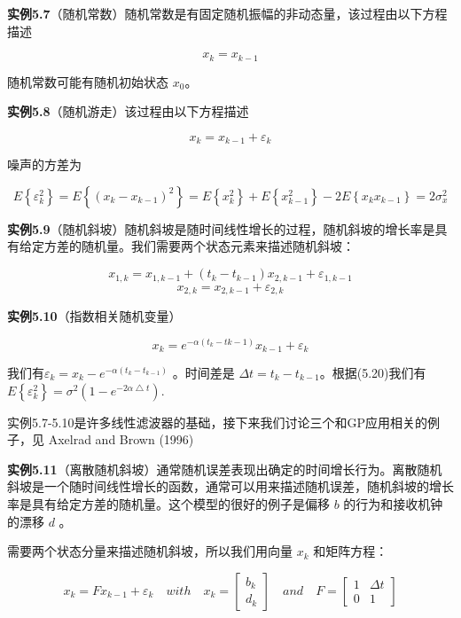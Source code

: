 		 \textbf{实例5.7}（随机常数）随机常数是有固定随机振幅的非动态量，该过程由以下方程描述
		 
		 \[ x_{k}=x_{k-1} \]
		 
		 随机常数可能有随机初始状态 $ x_{0} $。
		 
		 \textbf{实例5.8}（随机游走）该过程由以下方程描述
		 
		 	\[ x_{k}=x_{k-1}+\varepsilon_{k} \]
		 
		 噪声的方差为
		 
		 \[ E\left\lbrace \varepsilon_{k}^{2}\right\rbrace = E\left\lbrace(x_{k}-x_{k-1})^{2} \right\rbrace =E\left\lbrace x_{k}^{2} \right\rbrace +E\left\lbrace x_{k-1}^{2} \right\rbrace -2E\left\lbrace x_{k}x_{k-1} \right\rbrace =2\sigma_{x}^{2} \]
		 
		 \textbf{实例5.9}（随机斜坡）随机斜坡是随时间线性增长的过程，随机斜坡的增长率是具有给定方差的随机量。我们需要两个状态元素来描述随机斜坡：
		 
		 	\[ x_{1,k}=x_{1,k-1}+(t_{k}-t_{k-1})x_{2,k-1}+\varepsilon_{1,k-1} \]
		 \[ x_{2,k}=x_{2,k-1}+\varepsilon_{2,k} \]
		 
		 \textbf{实例5.10}（指数相关随机变量）
		 
		 \[ x_{k}=e^{-\alpha(t_{k}-t{k-1})}x_{k-1}+\varepsilon_{k}\]
		 
		 我们有$ \varepsilon_{k}=x_{k}-e^{-\alpha(t_{k}-t_{k-1})} $ 。时间差是 $ \Delta t=t_{k}-t_{k-1} $。根据(5.20)我们有$ E\left\lbrace \varepsilon_{k}^{2}\right\rbrace =\sigma^{2}(1-e^{-2 \alpha   \bigtriangleup t  })  $.
		 
		 实例5.7-5.10是许多线性滤波器的基础，接下来我们讨论三个和GP应用相关的例子，见 Axelrad and Brown (1996)
		 
		 \textbf{实例5.11}（离散随机斜坡）通常随机误差表现出确定的时间增长行为。离散随机斜坡是一个随时间线性增长的函数，通常可以用来描述随机误差，随机斜坡的增长率是具有给定方差的随机量。这个模型的很好的例子是偏移 $  b $ 的行为和接收机钟的漂移 $ d $ 。
		 
		 需要两个状态分量来描述随机斜坡，所以我们用向量 $ x_{k} $ 和矩阵方程：
		 
		 
		 	\begin{equation}\label{5.27}
		 x_{k}=Fx_{k-1}+\varepsilon _{k} \quad with \quad  x_{k}= \begin{bmatrix} b_{k}  \\ d_{k}\end{bmatrix} \quad and\quad F=\begin{bmatrix} 1&\Delta t  \\ 0 & 1 \end{bmatrix}
		 \end{equation}
		  
